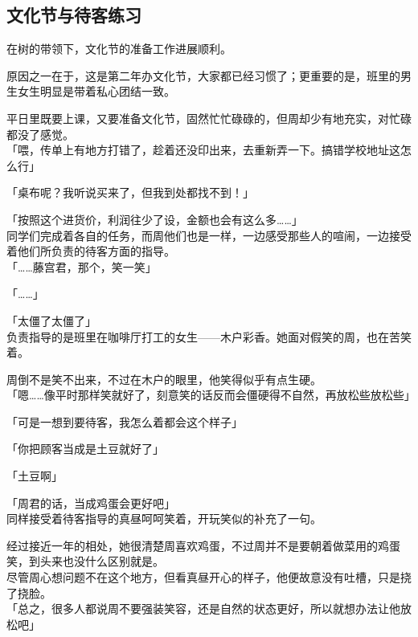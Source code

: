 \subsection{文化节与待客练习}

在树的带领下，文化节的准备工作进展顺利。

原因之一在于，这是第二年办文化节，大家都已经习惯了；更重要的是，班里的男生女生明显是带着私心团结一致。

平日里既要上课，又要准备文化节，固然忙忙碌碌的，但周却少有地充实，对忙碌都没了感觉。\\

「喂，传单上有地方打错了，趁着还没印出来，去重新弄一下。搞错学校地址这怎么行」

「桌布呢？我听说买来了，但我到处都找不到！」

「按照这个进货价，利润往少了设，金额也会有这么多……」\\

同学们完成着各自的任务，而周他们也是一样，一边感受那些人的喧闹，一边接受着他们所负责的待客方面的指导。\\

「……藤宫君，那个，笑一笑」

「……」

「太僵了太僵了」\\

负责指导的是班里在咖啡厅打工的女生——木户彩香。她面对假笑的周，也在苦笑着。

周倒不是笑不出来，不过在木户的眼里，他笑得似乎有点生硬。\\

「嗯……像平时那样笑就好了，刻意笑的话反而会僵硬得不自然，再放松些放松些」

「可是一想到要待客，我怎么着都会这个样子」

「你把顾客当成是土豆就好了」

「土豆啊」

「周君的话，当成鸡蛋会更好吧」\\

同样接受着待客指导的真昼呵呵笑着，开玩笑似的补充了一句。

经过接近一年的相处，她很清楚周喜欢鸡蛋，不过周并不是要朝着做菜用的鸡蛋笑，到头来也没什么区别就是。\\

尽管周心想问题不在这个地方，但看真昼开心的样子，他便故意没有吐槽，只是挠了挠脸。\\

「总之，很多人都说周不要强装笑容，还是自然的状态更好，所以就想办法让他放松吧」

